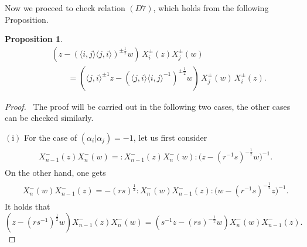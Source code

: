 \documentclass{amsproc}
\newtheorem{prop}[theo]{Proposition}
\theoremstyle{remark}
\numberwithin{equation}{section}
\begin{document}
Now we proceed to check relation $(D7)$, which holds from the following Proposition.
\begin{prop}
\begin{eqnarray*}
&&(z-({\langle} i,j{\rangle}{\langle}
j,i{\rangle})^{\pm\frac1{2}}w)\,X_i^{\pm}(z)X_j^{\pm}(w)\\
&&\qquad =({\langle}
j,i{\rangle}^{\pm1}z-({\langle} j,i{\rangle}{\langle}
i,j{\rangle}^{-1})^{\pm\frac1{2}}w)\,X_j^{\pm}(w)\,X_i^{\pm}(z).
\end{eqnarray*}
\end{prop}
\begin{proof} \ The proof will be carried out in the following two cases, the other cases can be checked similarly.

 $(\text{i})$ For the case of $(\alpha_i|\alpha_j)=-1$, let us first consider
 \begin{eqnarray*}
 \begin{split}
 &X^-_{n-1}(z)X^-_{n}(w)=:X^-_{n-1}(z)X^-_{n}(w): \big(z-(r^{-1}s)^{-\frac{1}{2}}w\big)^{-1}.
\end{split}
\end{eqnarray*}
On the other hand, one gets
\begin{eqnarray*}
 \begin{split}
 & X^-_{n}(w)X^-_{n-1}(z)=-(rs)^{\frac{1}{2}}:X^-_{n}(w)X^-_{n-1}(z): \big(w-(r^{-1}s)^{-\frac{1}{2}}z\big)^{-1}.
\end{split}
\end{eqnarray*}
It holds that
$$(z-(rs^{-1})^{\frac{1}{2}}w)X^-_{n-1}(z)X^-_{n}(w)
=(s^{-1}z-(rs)^{-\frac{1}{2}}w)X^-_{n}(w)X^-_{n-1}(z).$$


\end{proof}
\end{document}
